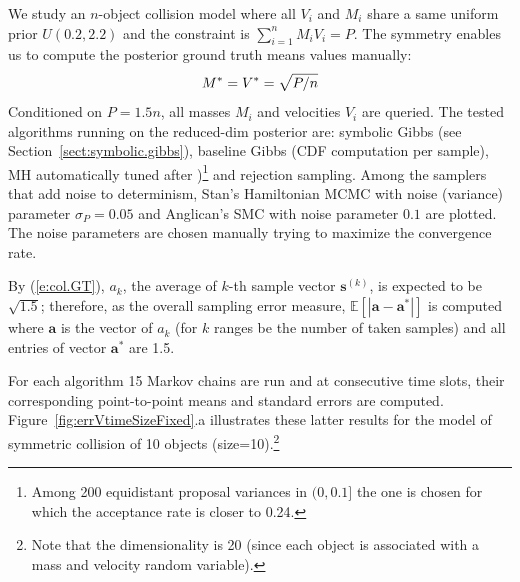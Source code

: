 \documentclass{article}
\newcommand{\bvec}[1]{\textbf{#1}}
\begin{document}
We study an $n$-object collision model where 
all $V_i$ and $M_i$ share a same uniform prior $U(0.2, 2.2)$ and the constraint is $\sum_{i=1}^n{M_i V_i} = P$. 
The symmetry enables us to compute the posterior ground truth means  values  manually:
\begin{equation}\footnotesize
\label{e:col.GT}
M^* = V^* = \sqrt{P / n} %
\end{equation}
Conditioned on $P = 1.5 n$, all masses $M_i$ and velocities  $V_i$ are queried. 
The tested algorithms running on the reduced-dim posterior are: 
symbolic Gibbs (see Section~\ref{sect:symbolic.gibbs}), 
baseline Gibbs (CDF computation per sample), 
MH automatically tuned %
after \cite{roberts1997weak})\footnote{
\label{foot:tuning}
Among 200 {\color{green} equidistant} proposal variances in %
$(0, 0.1]$ %
the one is chosen for which the acceptance rate is closer to 0.24.
} and rejection sampling.
Among the samplers that add noise to determinism, %
Stan's Hamiltonian MCMC with noise (variance) parameter 
$\sigma_P = 0.05$ and Anglican's SMC with noise parameter $0.1$ are plotted.
The noise parameters are chosen manually trying to maximize the convergence rate.

By (\ref{e:col.GT}), $a_k$, the average  of $k$-th sample vector $\bvec{s}^{(k)}$,
is expected to be $\sqrt{1.5}$;   
therefore, as the overall sampling error measure, 
$\mathbb{E}[|\bvec{a} - \bvec{a}^*|]$ is computed where
$\bvec{a}$ is the vector of $a_k$ (for $k$ ranges be the number of taken samples) and all entries of vector $\bvec{a}^*$ are 1.5.

For each algorithm 15 Markov chains are run and 
at consecutive time slots, their corresponding point-to-point means and standard errors are computed. 
Figure~\ref{fig:errVtimeSizeFixed}.a 
illustrates these latter results for the model of symmetric collision of 10 objects (size=10).\footnote{
Note that the dimensionality is 20 (since each object is associated with a mass and velocity random variable). %
} 
\end{document}
